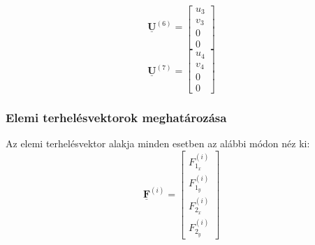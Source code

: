 \documentclass[12pt,a4paper]{article}
\def\vec#1{\underline{\mathbf{#1}}}
\def\i{\left(i\right)}
\begin{document}
\begin{multicols}{7}
    \columnbreak
    \begin{equation*}
        \vec{U}^{\left(6\right)}=
        \begin{bmatrix}
            u_3 \\
            v_3 \\
            0   \\
            0
        \end{bmatrix}
    \end{equation*}
    \columnbreak
    \begin{equation*}
        \vec{U}^{\left(7\right)}=
        \begin{bmatrix}
            u_4 \\
            v_4 \\
            0   \\
            0
        \end{bmatrix}
    \end{equation*}
\end{multicols}
\subsubsection{Elemi terhelésvektorok meghatározása}
Az elemi terhelésvektor alakja minden esetben az alábbi módon néz ki:
\begin{equation}
    \vec{F}^{\i}=
    \begin{bmatrix}
        F_{1_x}^{\i} \\
        F_{1_y}^{\i} \\
        F_{2_x}^{\i} \\
        F_{2_y}^{\i}
    \end{bmatrix}
\end{equation}
\end{document}
